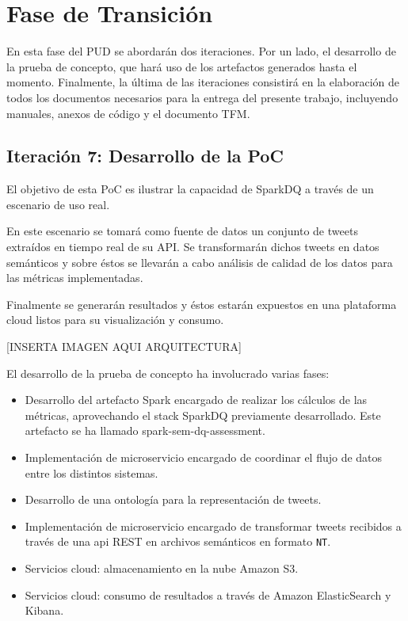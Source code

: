 \section{Fase de Transición}

En esta fase del \acs{PUD} se abordarán dos iteraciones. Por un lado, el
desarrollo de la prueba de concepto, que hará uso de los artefactos generados
hasta el momento. Finalmente, la última de las iteraciones consistirá en la
elaboración de todos los documentos necesarios para la entrega del presente
trabajo, incluyendo manuales, anexos de código y el documento \acs{TFM}. 

\subsection{Iteración 7: Desarrollo de la \acs{PoC}}



El objetivo de esta \acs{PoC} es ilustrar la capacidad de SparkDQ a través de un
escenario de uso real. 

En este escenario se tomará como fuente de datos un
conjunto de tweets extraídos en tiempo real de su API. Se transformarán dichos
tweets en datos semánticos y sobre éstos se llevarán a cabo análisis de calidad
de los datos para las métricas implementadas. 

Finalmente se generarán resultados y éstos estarán expuestos en una plataforma
cloud listos para su visualización y consumo. 

[INSERTA IMAGEN AQUI ARQUITECTURA]

El desarrollo de la prueba de concepto ha involucrado varias fases: 

\begin{itemize}
\item Desarrollo del artefacto Spark encargado de realizar los cálculos de las
  métricas, aprovechando el stack SparkDQ previamente desarrollado. Este
  artefacto se ha llamado spark-sem-dq-assessment. 
\item Implementación de microservicio encargado de coordinar el flujo de datos
  entre los distintos sistemas. 
\item Desarrollo de una ontología para la representación de tweets. 
\item Implementación de microservicio encargado de transformar tweets recibidos
 a través de una api REST en archivos semánticos en formato \texttt{NT}. 
\item Servicios cloud: almacenamiento en la nube Amazon S3. 
\item Servicios cloud: consumo de resultados a través de Amazon ElasticSearch y
  Kibana. 

\end{itemize}

